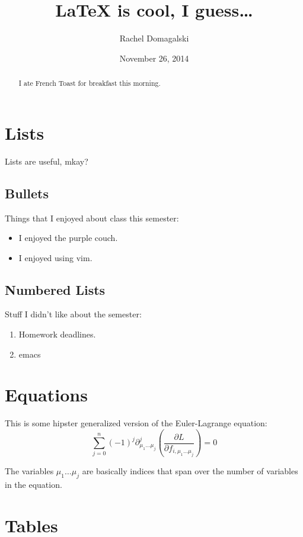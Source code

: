 \documentclass[12pt,letterpaper]{article}
\title{LaTeX is cool, I guess\dots}
\author{Rachel Domagalski}
\date{November 26, 2014}
\begin{document}
\maketitle

\begin{abstract}
    I ate French Toast for breakfast this morning.
\end{abstract}

\section{Lists}

Lists are useful, mkay?

\subsection{Bullets}

Things that I enjoyed about class this semester:
\begin{itemize}
    \item I enjoyed the purple couch.
    \item I enjoyed using vim.
\end{itemize}

\subsection{Numbered Lists}

Stuff I didn't like about the semester:
\begin{enumerate}
    \item Homework deadlines.
    \item emacs
\end{enumerate}

\section{Equations}

This is some hipster generalized version of the Euler-Lagrange equation:
\begin{equation}
    \sum_{j=0}^{n} \left(-1\right)^j \partial^j_{\mu_1\dots\mu_j}
    \left(\frac{\partial L}{\partial f_{i,\mu_1\dots\mu_j}}\right) = 0
\end{equation}

The variables $\mu_1\dots\mu_j$ are basically indices that span over the number
of variables in the equation.

\section{Tables}
\end{document}
